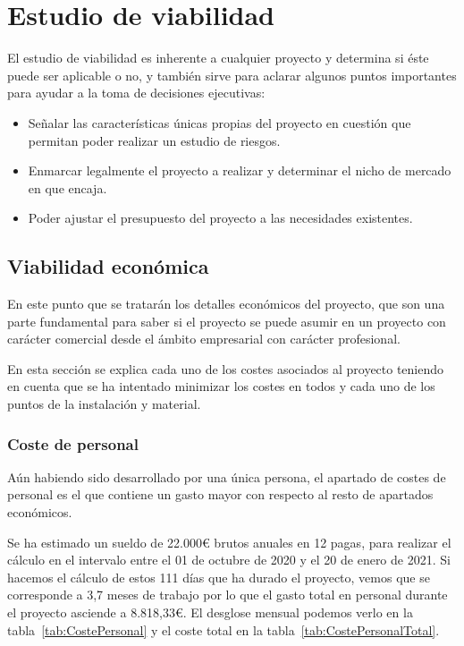 \section{Estudio de viabilidad}
El estudio de viabilidad es inherente a cualquier proyecto y determina si éste puede ser aplicable o no, y también sirve para aclarar algunos puntos importantes para ayudar a la toma de decisiones ejecutivas:
\begin{itemize}
    \item Señalar las características únicas propias del proyecto en cuestión que permitan poder realizar un estudio de riesgos.
    \item Enmarcar legalmente el proyecto a realizar y determinar el nicho de mercado en que encaja.
    \item Poder ajustar el presupuesto del proyecto a las necesidades existentes.
\end{itemize}

\subsection{Viabilidad económica}
En este punto que se tratarán los detalles económicos del proyecto, que son una parte fundamental para saber si el proyecto se puede asumir en un proyecto con carácter comercial desde el ámbito empresarial con carácter profesional.

En esta sección se explica cada uno de los costes asociados al proyecto teniendo en cuenta que se ha intentado minimizar los costes en todos y cada uno de los puntos de la instalación y material.

\subsubsection{Coste de personal}
Aún habiendo sido desarrollado por una única persona, el apartado de costes de personal es el que contiene un gasto mayor con respecto al resto de apartados económicos.

Se ha estimado un sueldo de 22.000€ brutos anuales en 12 pagas, para realizar el cálculo en el intervalo entre el 01 de octubre de 2020 y el 20 de enero de 2021. Si hacemos el cálculo de estos 111 días que ha durado el proyecto, vemos que se corresponde a 3,7 meses de trabajo por lo que el gasto total en personal durante el proyecto asciende a 8.818,33€.
El desglose mensual podemos verlo en la tabla~\ref{tab:CostePersonal} y el coste total en la tabla~\ref{tab:CostePersonalTotal}.


